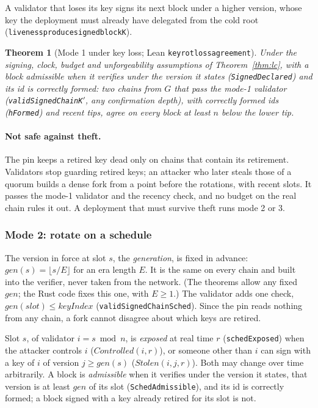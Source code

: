 \documentclass[10pt]{article}
\newtheorem{theorem}{Theorem}
\DeclareRobustCommand{\code}[1]{{\renewcommand{\_}{\textunderscore\allowbreak}\texttt{#1}}}
\begin{document}
A validator that loses its key signs its next block under a higher
version, whose key the deployment must already have delegated from the
cold root (\code{liveness\_produce\_signed\_blockK}).

\begin{theorem}[Mode 1 under key loss; Lean
\code{keyrot\_loss\_agreement}]\label{thm:keyloss}
Under the signing, clock, budget and unforgeability assumptions of
Theorem~\ref{thm:lc}, with a block admissible
when it verifies under the version it states (\code{SignedDeclared}) and
its id is correctly formed: two chains from $G$ that pass the mode-1
validator (\code{validSignedChainK$'$}, any confirmation depth), with
correctly formed ids (\code{hFormed}) and recent tips, agree on every
block at least $n$ below the lower tip.
\end{theorem}

\paragraph{Not safe against theft.} The pin keeps a retired key dead
only on chains that contain its retirement. Validators stop guarding
retired keys; an attacker who later steals those of a quorum builds a
dense fork from a point before the rotations, with recent slots. It
passes the mode-1 validator and the recency check, and no budget on the
real chain rules it out. A deployment that must survive theft runs mode
2 or 3.

\subsubsection*{Mode 2: rotate on a schedule}

The version in force at slot $s$, the \emph{generation}, is fixed in
advance: $\mathit{gen}(s) = \lfloor s/E \rfloor$ for an era length $E$.
It is the same on every chain and built into the verifier, never taken
from the network. (The theorems allow any fixed $\mathit{gen}$; the Rust
code fixes this one, with $E \ge 1$.) The validator adds one check,
$\mathit{gen}(\mathit{slot}) \le \mathit{keyIndex}$
(\code{validSignedChainSched}). Since the pin reads nothing from any
chain, a fork cannot disagree about which keys are retired.

Slot $s$, of validator $i = s \bmod n$, is \emph{exposed} at real time
$r$ (\code{schedExposed}) when the attacker controls $i$
($\mathit{Controlled}(i, r)$), or someone other than $i$ can sign with a
key of $i$ of version $j \ge \mathit{gen}(s)$ ($\mathit{Stolen}(i, j, r)$).
Both may change over time arbitrarily. A block is \emph{admissible} when
it verifies under the version it states, that version is at least
$\mathit{gen}$ of its slot (\code{SchedAdmissible}), and its id is
correctly formed; a block signed with a key already retired for its slot
is not.
\end{document}
